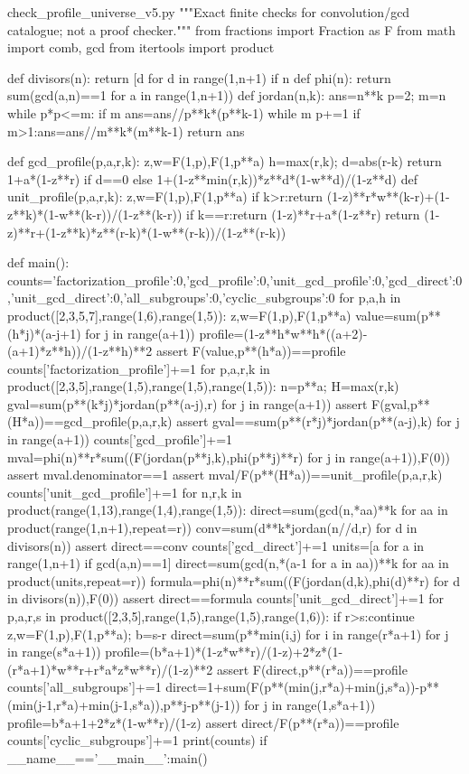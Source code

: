 \begin{filecontents*}[overwrite]{check_profile_universe_v5.py}
"""Exact finite checks for convolution/gcd catalogue; not a proof checker."""
from fractions import Fraction as F
from math import comb, gcd
from itertools import product

def divisors(n):
    return [d for d in range(1,n+1) if n%
def phi(n):
    return sum(gcd(a,n)==1 for a in range(1,n+1))
def jordan(n,k):
    ans=n**k
    p=2; m=n
    while p*p<=m:
        if m%
            ans=ans//p**k*(p**k-1)
            while m%
        p+=1
    if m>1:ans=ans//m**k*(m**k-1)
    return ans

def gcd_profile(p,a,r,k):
    z,w=F(1,p),F(1,p**a)
    h=max(r,k); d=abs(r-k)
    return 1+a*(1-z**r) if d==0 else 1+(1-z**min(r,k))*z**d*(1-w**d)/(1-z**d)
def unit_profile(p,a,r,k):
    z,w=F(1,p),F(1,p**a)
    if k>r:return (1-z)**r*w**(k-r)+(1-z**k)*(1-w**(k-r))/(1-z**(k-r))
    if k==r:return (1-z)**r+a*(1-z**r)
    return (1-z)**r+(1-z**k)*z**(r-k)*(1-w**(r-k))/(1-z**(r-k))

def main():
    counts={'factorization_profile':0,'gcd_profile':0,'unit_gcd_profile':0,'gcd_direct':0,'unit_gcd_direct':0,'all_subgroups':0,'cyclic_subgroups':0}
    for p,a,h in product([2,3,5,7],range(1,6),range(1,5)):
        z,w=F(1,p),F(1,p**a)
        value=sum(p**(h*j)*(a-j+1) for j in range(a+1))
        profile=(1-z**h*w**h*((a+2)-(a+1)*z**h))/(1-z**h)**2
        assert F(value,p**(h*a))==profile
        counts['factorization_profile']+=1
    for p,a,r,k in product([2,3,5],range(1,5),range(1,5),range(1,5)):
        n=p**a; H=max(r,k)
        gval=sum(p**(k*j)*jordan(p**(a-j),r) for j in range(a+1))
        assert F(gval,p**(H*a))==gcd_profile(p,a,r,k)
        assert gval==sum(p**(r*j)*jordan(p**(a-j),k) for j in range(a+1))
        counts['gcd_profile']+=1
        mval=phi(n)**r*sum((F(jordan(p**j,k),phi(p**j)**r) for j in range(a+1)),F(0))
        assert mval.denominator==1
        assert mval/F(p**(H*a))==unit_profile(p,a,r,k)
        counts['unit_gcd_profile']+=1
    for n,r,k in product(range(1,13),range(1,4),range(1,5)):
        direct=sum(gcd(n,*aa)**k for aa in product(range(1,n+1),repeat=r))
        conv=sum(d**k*jordan(n//d,r) for d in divisors(n))
        assert direct==conv
        counts['gcd_direct']+=1
        units=[a for a in range(1,n+1) if gcd(a,n)==1]
        direct=sum(gcd(n,*(a-1 for a in aa))**k for aa in product(units,repeat=r))
        formula=phi(n)**r*sum((F(jordan(d,k),phi(d)**r) for d in divisors(n)),F(0))
        assert direct==formula
        counts['unit_gcd_direct']+=1
    for p,a,r,s in product([2,3,5],range(1,5),range(1,5),range(1,6)):
        if r>s:continue
        z,w=F(1,p),F(1,p**a); b=s-r
        direct=sum(p**min(i,j) for i in range(r*a+1) for j in range(s*a+1))
        profile=(b*a+1)*(1-z*w**r)/(1-z)+2*z*(1-(r*a+1)*w**r+r*a*z*w**r)/(1-z)**2
        assert F(direct,p**(r*a))==profile
        counts['all_subgroups']+=1
        direct=1+sum(F(p**(min(j,r*a)+min(j,s*a))-p**(min(j-1,r*a)+min(j-1,s*a)),p**j-p**(j-1)) for j in range(1,s*a+1))
        profile=b*a+1+2*z*(1-w**r)/(1-z)
        assert direct/F(p**(r*a))==profile
        counts['cyclic_subgroups']+=1
    print(counts)
if __name__=='__main__':main()


\end{filecontents*}
